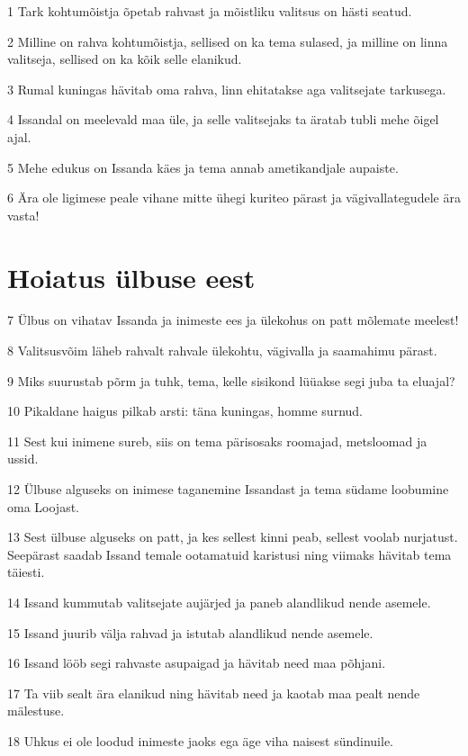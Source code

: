 \par 1 Tark kohtumõistja õpetab rahvast ja mõistliku valitsus on hästi seatud.
\par 2 Milline on rahva kohtumõistja, sellised on ka tema sulased, ja milline on linna valitseja, sellised on ka kõik selle elanikud.
\par 3 Rumal kuningas hävitab oma rahva, linn ehitatakse aga valitsejate tarkusega.
\par 4 Issandal on meelevald maa üle, ja selle valitsejaks ta äratab tubli mehe õigel ajal.
\par 5 Mehe edukus on Issanda käes ja tema annab ametikandjale aupaiste.
\par 6 Ära ole ligimese peale vihane mitte ühegi kuriteo pärast ja vägivallategudele ära vasta!

\section*{Hoiatus ülbuse eest}

\par 7 Ülbus on vihatav Issanda ja inimeste ees ja ülekohus on patt mõlemate meelest!
\par 8 Valitsusvõim läheb rahvalt rahvale ülekohtu, vägivalla ja saamahimu pärast.
\par 9 Miks suurustab põrm ja tuhk, tema, kelle sisikond lüüakse segi juba ta eluajal?
\par 10 Pikaldane haigus pilkab arsti: täna kuningas, homme surnud.
\par 11 Sest kui inimene sureb, siis on tema pärisosaks roomajad, metsloomad ja ussid.
\par 12 Ülbuse alguseks on inimese taganemine Issandast ja tema südame loobumine oma Loojast.
\par 13 Sest ülbuse alguseks on patt, ja kes sellest kinni peab, sellest voolab nurjatust. Seepärast saadab Issand temale ootamatuid karistusi ning viimaks hävitab tema täiesti.
\par 14 Issand kummutab valitsejate aujärjed ja paneb alandlikud nende asemele.
\par 15 Issand juurib välja rahvad ja istutab alandlikud nende asemele.
\par 16 Issand lööb segi rahvaste asupaigad ja hävitab need maa põhjani.
\par 17 Ta viib sealt ära elanikud ning hävitab need ja kaotab maa pealt nende mälestuse.
\par 18 Uhkus ei ole loodud inimeste jaoks ega äge viha naisest sündinuile.

